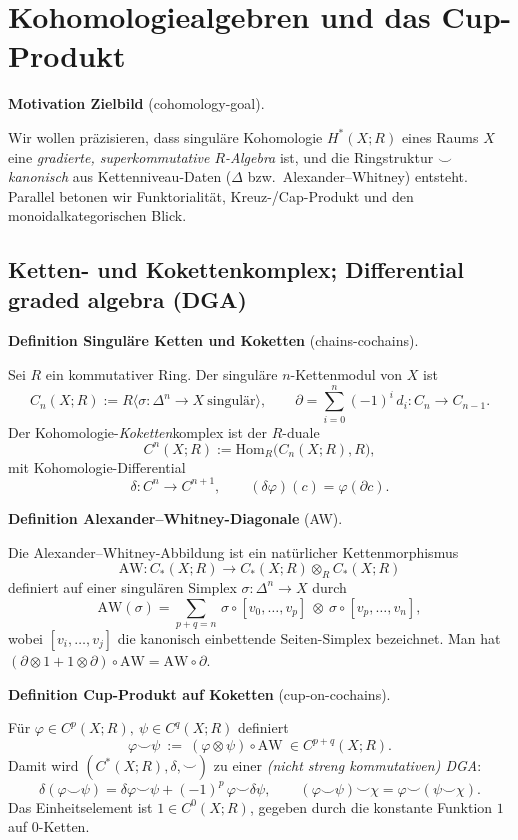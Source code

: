 \documentclass[10pt, letterpaper]{article}
\newcommand{\Hom}{\mathrm{Hom}}
\newcommand{\CustomHeading}[3]{%
  \par\medskip\noindent%
  \textbf{#1 #2} \textnormal{(#3)}.\enskip%
}
\newenvironment{DEF}[2]{\begin{unitbox}\CustomHeading{Definition}{#1}{#2}}{\end{unitbox}}
\newenvironment{MOT}[2]{\begin{unitbox}\CustomHeading{Motivation}{#1}{#2}}{\end{unitbox}}
\begin{document}
\pagebreak


\section{Kohomologiealgebren und das Cup-Produkt}
\label{sec:cohomology-algebra}

\begin{MOT}{Zielbild}{cohomology-goal}
Wir wollen präzisieren, dass singuläre Kohomologie \(H^\ast(X;R)\) eines Raums \(X\) eine \emph{gradierte, superkommutative \(R\)-Algebra} ist, und die Ringstruktur \(\smile\) \emph{kanonisch} aus Kettenniveau-Daten (\(\Delta\) bzw.\ Alexander--Whitney) entsteht. Parallel betonen wir Funktorialität, Kreuz-/Cap-Produkt und den monoidalkategorischen Blick.
\end{MOT}

\subsection{Ketten- und Kokettenkomplex; Differential graded algebra (DGA)}

\begin{DEF}{Singuläre Ketten und Koketten}{chains-cochains}
Sei \(R\) ein kommutativer Ring. Der singuläre \(n\)-Kettenmodul von \(X\) ist
\[
C_n(X;R):=R\big\langle \sigma:\Delta^n\to X\ \text{singulär}\big\rangle,\qquad
\partial=\sum_{i=0}^{n}(-1)^i\,d_i: C_n\to C_{n-1}.
\]
Der Kohomologie-\emph{Koketten}komplex ist der \(R\)-duale
\[
C^n(X;R):=\Hom_R\!\big(C_n(X;R),R\big),
\]
mit Kohomologie-Differential
\[
\delta:C^n\to C^{n+1},\qquad (\delta\varphi)(c)=\varphi(\partial c).
\]
\end{DEF}

\begin{DEF}{Alexander--Whitney-Diagonale}{AW}
Die Alexander--Whitney-Abbildung ist ein natürlicher Kettenmorphismus
\[
\mathrm{AW}:C_\ast(X;R)\longrightarrow C_\ast(X;R)\otimes_R C_\ast(X;R)
\]
definiert auf einer singulären Simplex \(\sigma:\Delta^n\to X\) durch
\[
\mathrm{AW}(\sigma)=\sum_{p+q=n}\,
\sigma\!\circ\! [v_0,\dots,v_p]\ \otimes\ \sigma\!\circ\! [v_p,\dots,v_n],
\]
wobei \([v_i,\dots,v_j]\) die kanonisch einbettende Seiten-Simplex bezeichnet. Man hat \((\partial\otimes 1+1\otimes\partial)\circ \mathrm{AW}=\mathrm{AW}\circ\partial\).
\end{DEF}

\begin{DEF}{Cup-Produkt auf Koketten}{cup-on-cochains}
Für \(\varphi\in C^p(X;R),\ \psi\in C^q(X;R)\) definiert
\[
\varphi\smile\psi\ :=\ (\varphi\otimes\psi)\circ \mathrm{AW}\ \in C^{p+q}(X;R).
\]
Damit wird \((C^\ast(X;R),\delta,\smile)\) zu einer \emph{(nicht streng kommutativen) DGA}:
\[
\delta(\varphi\smile\psi)=\delta\varphi\smile\psi+(-1)^p\,\varphi\smile\delta\psi,\qquad
(\varphi\smile\psi)\smile\chi=\varphi\smile(\psi\smile\chi).
\]
Das Einheits\-element ist \(1\in C^0(X;R)\), gegeben durch die konstante Funktion \(1\) auf \(0\)-Ketten.
\end{DEF}
\end{document}
